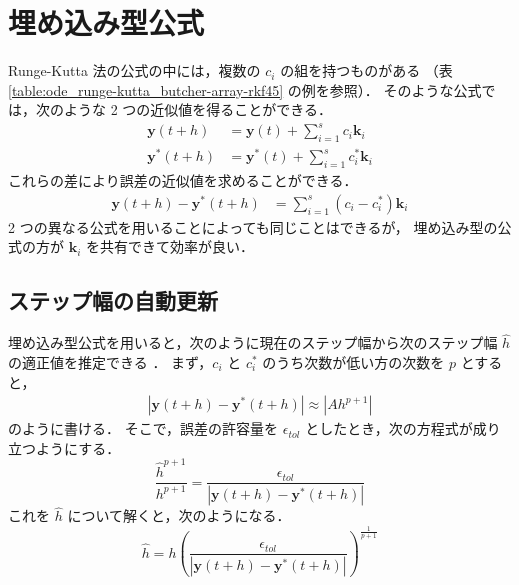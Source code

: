 \section{埋め込み型公式}

Runge-Kutta 法の公式の中には，複数の $c_i$ の組を持つものがある
（表 \ref{table:ode_runge-kutta_butcher-array-rkf45} の例を参照）．
そのような公式では，次のような 2 つの近似値を得ることができる．
\begin{align}
    \bm{y}(t + h)   & = \bm{y}(t) + \sum_{i=1}^s c_i \bm{k}_i     \\
    \bm{y}^*(t + h) & = \bm{y}^*(t) + \sum_{i=1}^s c_i^* \bm{k}_i
\end{align}
これらの差により誤差の近似値を求めることができる．
\begin{align}
    \bm{y}(t + h) - \bm{y}^*(t + h) & = \sum_{i=1}^s (c_i - c_i^*) \bm{k}_i
\end{align}
2 つの異なる公式を用いることによっても同じことはできるが，
埋め込み型の公式の方が $\bm{k}_i$ を共有できて効率が良い．

\subsection{ステップ幅の自動更新}

埋め込み型公式を用いると，次のように現在のステップ幅から次のステップ幅 $\hat{h}$ の適正値を推定できる
\cite[4.1 節 (a)]{Mitsui1993}．
まず，$c_i$ と $c_i^*$ のうち次数が低い方の次数を $p$ とすると，
\begin{align}
    \left| \bm{y}(t + h) - \bm{y}^*(t + h) \right| \approx |Ah^{p+1}|
    \label{eq:ode_runge-kutta_error-using-embedded-formula}
\end{align}
のように書ける．
そこで，誤差の許容量を $\epsilon_{tol}$ としたとき，次の方程式が成り立つようにする．
\begin{equation}
    \frac{\hat{h}^{p+1}}{h^{p+1}}
    = \frac{\epsilon_{tol}}{\left| \bm{y}(t + h) - \bm{y}^*(t + h) \right|}
\end{equation}
これを $\hat{h}$ について解くと，次のようになる．
\begin{equation}
    \hat{h} = h
    \left(\frac{\epsilon_{tol}}{\left| \bm{y}(t + h) - \bm{y}^*(t + h) \right|}\right)^{\frac{1}{p+1}}
    \label{eq:ode_runge-kutta_auto-next-step-size}
\end{equation}

